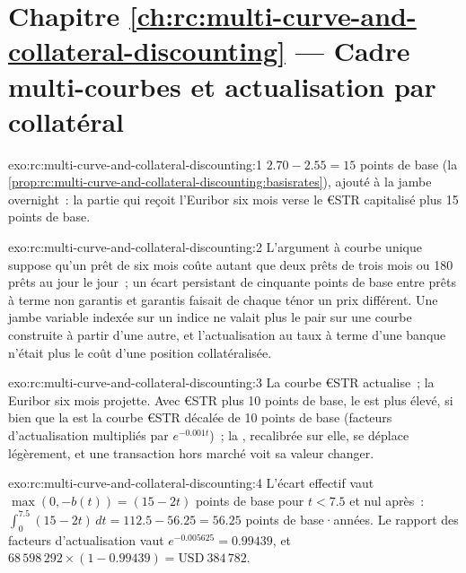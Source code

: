 \section*{Chapitre \ref{ch:rc:multi-curve-and-collateral-discounting} --- Cadre multi-courbes et actualisation par collatéral}

\begin{solution}{exo:rc:multi-curve-and-collateral-discounting:1}
$2.70-2.55 = 15$ points de base
(la \cref{prop:rc:multi-curve-and-collateral-discounting:basisrates}), ajouté à la
jambe overnight~: la partie qui reçoit l'Euribor six mois verse le €STR capitalisé plus
15 points de base.
\end{solution}

\begin{solution}{exo:rc:multi-curve-and-collateral-discounting:2}
L'argument à courbe unique suppose qu'un prêt de six mois coûte autant que deux
prêts de trois mois ou 180 prêts au jour le jour~; un écart persistant de cinquante
points de base entre prêts à terme non garantis et garantis faisait de chaque ténor un
prix différent. Une jambe variable indexée sur un indice ne valait plus le pair sur une courbe
construite à partir d'une autre, et l'actualisation au taux à terme d'une banque n'était plus le
coût d'une position collatéralisée.
\end{solution}

\begin{solution}{exo:rc:multi-curve-and-collateral-discounting:3}
La courbe €STR actualise~; la  Euribor six mois projette. Avec
€STR plus 10 points de base, le  est plus élevé, si bien que la  est la courbe €STR décalée de 10 points de base (facteurs d'actualisation multipliés par
$e^{-0.001t}$)~; la , recalibrée sur elle, se déplace légèrement, et
une transaction hors marché voit sa valeur changer.
\end{solution}

\begin{solution}{exo:rc:multi-curve-and-collateral-discounting:4}
L'écart effectif vaut $\max(0,-b(t)) = (15-2t)$ points de base pour $t<7.5$
et nul après~: $\int_0^{7.5}(15-2t)\,dt = 112.5-56.25 = 56.25$
points de base·années. Le rapport des facteurs d'actualisation vaut $e^{-0.005625}=0.99439$, et
$68\,598\,292\times(1-0.99439) = \text{USD}~384\,782$.
\end{solution}

